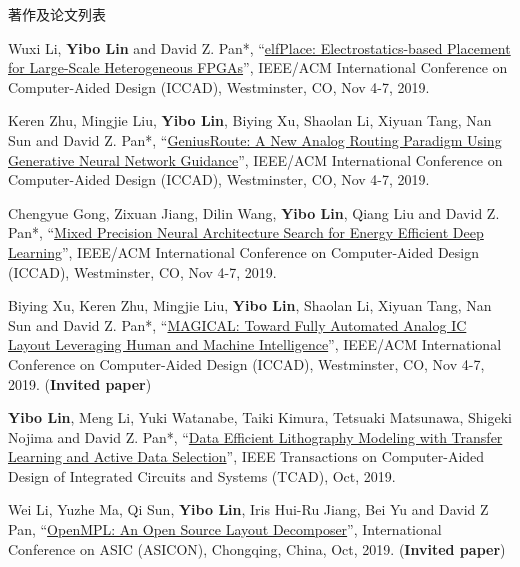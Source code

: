 \begin{rSection}{著作及论文列表}
\begin{description}[font=\normalfont, rightmargin=2em]
{}
            

\item[{[C48]}]{
        Wuxi Li, \textbf{Yibo Lin} and David Z. Pan*, 
    ``\href{https://doi.org/10.1109/ICCAD45719.2019.8942075}{elfPlace: Electrostatics-based Placement for Large-Scale Heterogeneous FPGAs}'', 
    IEEE/ACM International Conference on Computer-Aided Design (ICCAD), Westminster, CO, Nov 4-7, 2019.
    
}
            

\item[{[C47]}]{
        Keren Zhu, Mingjie Liu, \textbf{Yibo Lin}, Biying Xu, Shaolan Li, Xiyuan Tang, Nan Sun and David Z. Pan*, 
    ``\href{https://doi.org/10.1109/ICCAD45719.2019.8942164}{GeniusRoute: A New Analog Routing Paradigm Using Generative Neural Network Guidance}'', 
    IEEE/ACM International Conference on Computer-Aided Design (ICCAD), Westminster, CO, Nov 4-7, 2019.
    
}
            

\item[{[C46]}]{
        Chengyue Gong, Zixuan Jiang, Dilin Wang, \textbf{Yibo Lin}, Qiang Liu and David Z. Pan*, 
    ``\href{https://doi.org/10.1109/ICCAD45719.2019.8942147}{Mixed Precision Neural Architecture Search for Energy Efficient Deep Learning}'', 
    IEEE/ACM International Conference on Computer-Aided Design (ICCAD), Westminster, CO, Nov 4-7, 2019.
    
}
            

\item[{[C45]}]{
        Biying Xu, Keren Zhu, Mingjie Liu, \textbf{Yibo Lin}, Shaolan Li, Xiyuan Tang, Nan Sun and David Z. Pan*, 
    ``\href{https://doi.org/10.1109/ICCAD45719.2019.8942060}{MAGICAL: Toward Fully Automated Analog IC Layout Leveraging Human and Machine Intelligence}'', 
    IEEE/ACM International Conference on Computer-Aided Design (ICCAD), Westminster, CO, Nov 4-7, 2019.
    (\textbf{Invited paper})
}
            

\item[{[J44]}]{
        \textbf{Yibo Lin}, Meng Li, Yuki Watanabe, Taiki Kimura, Tetsuaki Matsunawa, Shigeki Nojima and David Z. Pan*, 
    ``\href{https://doi.org/10.1109/TCAD.2018.2864251}{Data Efficient Lithography Modeling with Transfer Learning and Active Data Selection}'', 
    IEEE Transactions on Computer-Aided Design of Integrated Circuits and Systems (TCAD), Oct, 2019.
    
}
            

\item[{[C43]}]{
        Wei Li, Yuzhe Ma, Qi Sun, \textbf{Yibo Lin}, Iris Hui-Ru Jiang, Bei Yu and David Z Pan, 
    ``\href{https://arxiv.org/abs/1809.07554}{OpenMPL: An Open Source Layout Decomposer}'', 
    International Conference on ASIC (ASICON), Chongqing, China, Oct, 2019.
    (\textbf{Invited paper})
}
            


\end{description}
\end{rSection}
